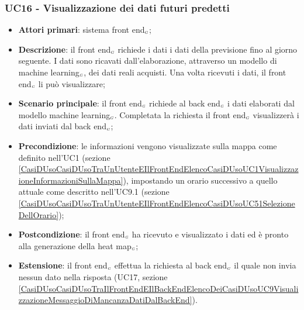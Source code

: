 \subsubsection{UC16 - Visualizzazione dei dati futuri predetti}\label{CasiDUsoCasiDUsoTraIlFrontEndEIlBackEndElencoDeiCasiDUsoUC83VisualizzazioneDeiDatiPredetti}
\begin{itemize}
	\item \textbf{Attori primari}: sistema front end$_{\scaleto{G}{3pt}}$;
	\item \textbf{Descrizione}: il front end$_{\scaleto{G}{3pt}}$ richiede i dati i dati della previsione fino al giorno seguente.
	I dati sono ricavati dall’elaborazione, attraverso un modello di machine learning$_{\scaleto{G}{3pt}}$, dei dati reali acquisti. Una volta ricevuti i dati, il front end$_{\scaleto{G}{3pt}}$ li può visualizzare;
	\item \textbf{Scenario principale}: il front end$_{\scaleto{G}{3pt}}$ richiede al back end$_{\scaleto{G}{3pt}}$ i dati elaborati dal modello machine learning$_{\scaleto{G}{3pt}}$. Completata la richiesta il front end$_{\scaleto{G}{3pt}}$ visualizzerà i dati inviati dal back end$_{\scaleto{G}{3pt}}$;
	\item \textbf{Precondizione}: le informazioni vengono visualizzate sulla mappa come definito nell’UC1 (sezione \ref{CasiDUsoCasiDUsoTraUnUtenteEIlFrontEndElencoCasiDUsoUC1VisualizzazioneInformazioniSullaMappa}), impostando un orario successivo a quello attuale come descritto nell’UC9.1 (sezione \ref{CasiDUsoCasiDUsoTraUnUtenteEIlFrontEndElencoCasiDUsoUC51SelezioneDellOrario});
	\item \textbf{Postcondizione}: il front end$_{\scaleto{G}{3pt}}$ ha ricevuto e visualizzato i dati ed è pronto alla generazione della heat map$_{\scaleto{G}{3pt}}$;
	\item \textbf{Estensione}: il front end$_{\scaleto{G}{3pt}}$ effettua la richiesta al back end$_{\scaleto{G}{3pt}}$ il quale non invia nessun dato nella risposta (UC17, sezione \ref{CasiDUsoCasiDUsoTraIlFrontEndEIlBackEndElencoDeiCasiDUsoUC9VisualizzazioneMessaggioDiMancanzaDatiDalBackEnd}).
\end{itemize}

